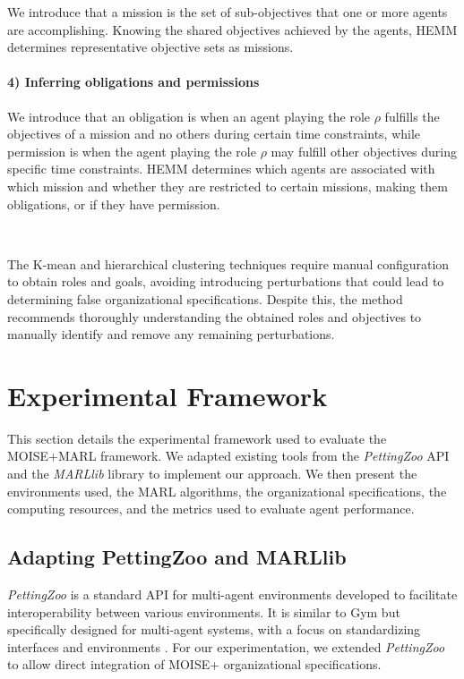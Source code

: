 \documentclass[sigconf,anonymous]{aamas}
\begin{document}
We introduce that a mission is the set of sub-objectives that one or more agents are accomplishing.
Knowing the shared objectives achieved by the agents, HEMM determines representative objective sets as missions.

\paragraph{\textbf{4) Inferring obligations and permissions}}

We introduce that an obligation is when an agent playing the role $\rho$ fulfills the objectives of a mission and no others during certain time constraints, while permission is when the agent playing the role $\rho$ may fulfill other objectives during specific time constraints.
HEMM determines which agents are associated with which mission and whether they are restricted to certain missions, making them obligations, or if they have permission.

\

The K-mean and hierarchical clustering techniques require manual configuration to obtain roles and goals, avoiding introducing perturbations that could lead to determining false organizational specifications. Despite this, the method recommends thoroughly understanding the obtained roles and objectives to manually identify and remove any remaining perturbations.

\section{Experimental Framework}
\label{sec:experimental_setup}

This section details the experimental framework used to evaluate the MOISE+MARL framework. We adapted existing tools from the \textit{PettingZoo} API and the \textit{MARLlib} library to implement our approach. We then present the environments used, the MARL algorithms, the organizational specifications, the computing resources, and the metrics used to evaluate agent performance.

\subsection{Adapting PettingZoo and MARLlib}

\textit{PettingZoo} is a standard API for multi-agent environments developed to facilitate interoperability between various environments. It is similar to Gym but specifically designed for multi-agent systems, with a focus on standardizing interfaces and environments \cite{terry2020pettingzoo}. For our experimentation, we extended \textit{PettingZoo} to allow direct integration of MOISE+ organizational specifications.
\end{document}
